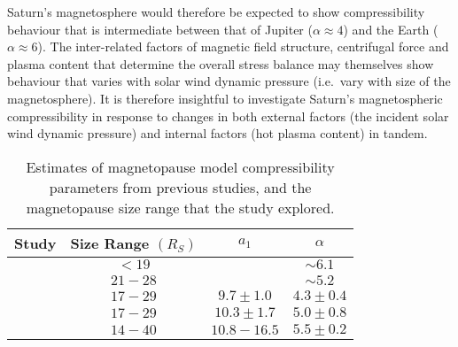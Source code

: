 Saturn's magnetosphere would therefore be expected to show compressibility behaviour that is intermediate between that of Jupiter ($\alpha \approx 4$) and the Earth ($\alpha \approx 6$). The inter-related factors of magnetic field structure, centrifugal force and plasma content that determine the overall stress balance may themselves show behaviour that varies with solar wind dynamic pressure (i.e.\ vary with size of the magnetosphere). It is therefore insightful to investigate Saturn's magnetospheric compressibility in response to changes in both external factors (the incident solar wind dynamic pressure) and internal factors (hot plasma content) in tandem.

\begin{table}
\caption[Estimates of magnetopause model compressibility parameters from previous studies.]{Estimates of magnetopause model compressibility parameters from previous studies, and the magnetopause size range that the study explored.}\label{compress:table:prevstudies}
\centering
\begin{tabular}{c c c c}
\hline
Study & Size Range $(\si{R_S})$ & $a_1$ & $\alpha$  \\
\hline
{\citet{slavin1985}} & $< 19$ & & ${\sim}6.1$ \\
{\citet{hansen2005}}  & $21 - 28 $ & & ${\sim}5.2$ \\
{\citet{arridge2006}} & $17-29$ & $9.7 \pm 1.0 $ & $4.3 \pm 0.4$  \\
{\citet{kanani2010}} & $17-29$ & $10.3 \pm 1.7 $ & $5.0 \pm 0.8$ \\
{\citet{pilkington2015}} & $14 - 40$ & $10.8 - 16.5$ & $5.5 \pm 0.2$ \\
\hline
\end{tabular}
\end{table}
